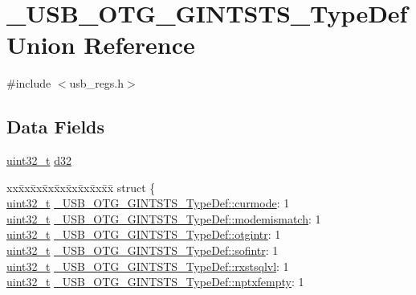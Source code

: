 \hypertarget{union___u_s_b___o_t_g___g_i_n_t_s_t_s___type_def}{\section{\-\_\-\-U\-S\-B\-\_\-\-O\-T\-G\-\_\-\-G\-I\-N\-T\-S\-T\-S\-\_\-\-Type\-Def Union Reference}
\label{union___u_s_b___o_t_g___g_i_n_t_s_t_s___type_def}
}


{\ttfamily \#include $<$usb\-\_\-regs.\-h$>$}

\subsection*{Data Fields}
\begin{DoxyCompactItemize}
\item 
\hyperlink{stdint_8h_a435d1572bf3f880d55459d9805097f62}{uint32\-\_\-t} \hyperlink{group___u_s_b___o_t_g___d_r_i_v_e_r_ga1855525a82d4050ac6b5175c46cb4764}{d32}
\item 
\begin{tabbing}
xx\=xx\=xx\=xx\=xx\=xx\=xx\=xx\=xx\=\kill
struct \{\\
\>\hyperlink{stdint_8h_a435d1572bf3f880d55459d9805097f62}{uint32\_t} \hyperlink{group___u_s_b___o_t_g___d_r_i_v_e_r_ga752eb7894d8acb9f1a4394967bfdd9ff}{\_USB\_OTG\_GINTSTS\_TypeDef::curmode}: 1\\
\>\hyperlink{stdint_8h_a435d1572bf3f880d55459d9805097f62}{uint32\_t} \hyperlink{group___u_s_b___o_t_g___d_r_i_v_e_r_gab4fbf47de9e36e092edfc6ee201616d2}{\_USB\_OTG\_GINTSTS\_TypeDef::modemismatch}: 1\\
\>\hyperlink{stdint_8h_a435d1572bf3f880d55459d9805097f62}{uint32\_t} \hyperlink{group___u_s_b___o_t_g___d_r_i_v_e_r_ga8c6022a9b96f1a881f956e7bafe64497}{\_USB\_OTG\_GINTSTS\_TypeDef::otgintr}: 1\\
\>\hyperlink{stdint_8h_a435d1572bf3f880d55459d9805097f62}{uint32\_t} \hyperlink{group___u_s_b___o_t_g___d_r_i_v_e_r_ga90db453bd6bcb2c78bab6c0688727181}{\_USB\_OTG\_GINTSTS\_TypeDef::sofintr}: 1\\
\>\hyperlink{stdint_8h_a435d1572bf3f880d55459d9805097f62}{uint32\_t} \hyperlink{group___u_s_b___o_t_g___d_r_i_v_e_r_ga5804e5c8afb57b10e1fd90dd4ad3286f}{\_USB\_OTG\_GINTSTS\_TypeDef::rxstsqlvl}: 1\\
\>\hyperlink{stdint_8h_a435d1572bf3f880d55459d9805097f62}{uint32\_t} \hyperlink{group___u_s_b___o_t_g___d_r_i_v_e_r_ga7f95aea2bd53e9566d83818c6062f1ca}{\_USB\_OTG\_GINTSTS\_TypeDef::nptxfempty}: 1\\

\end{tabbing}
\end{DoxyCompactItemize}
